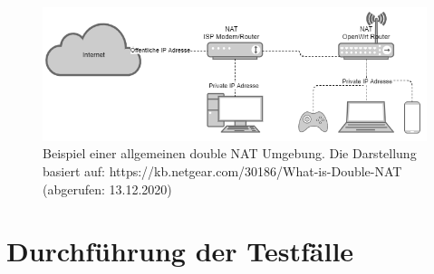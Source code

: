 \documentclass[a4paper]{book}
\begin{document}
\begin{large}
\begin{onehalfspace}
\begin{figure}[ht]
\begin{center}
\includegraphics[scale=0.4]{images/Double_NAT} 
\caption{Beispiel einer allgemeinen \glqq double NAT\grqq{} Umgebung. Die Darstellung basiert auf: https://kb.netgear.com/30186/What-is-Double-NAT (abgerufen: 13.12.2020) }
\label{fig:Double NAT Erklärung}
\end{center}
\end{figure}

\end{onehalfspace}

\section{Durchführung der Testfälle}
\label{Testfälle}

\end{large}
\end{document}
